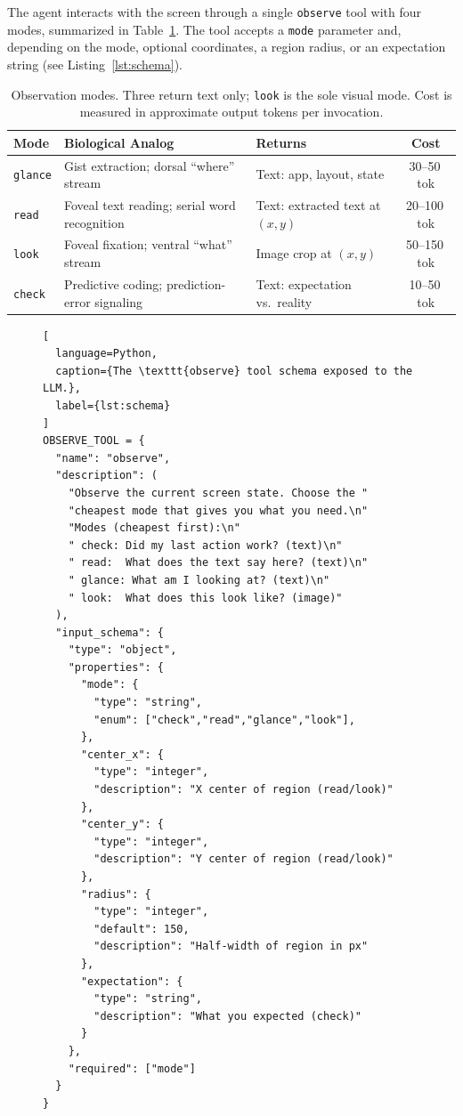 \documentclass[11pt,a4paper]{article}
\begin{document}
The agent interacts with the screen through a single \texttt{observe} tool
with four modes, summarized in Table~\ref{tab:modes}. The tool accepts a
\texttt{mode} parameter and, depending on the mode, optional coordinates, a
region radius, or an expectation string (see Listing~\ref{lst:schema}).

\begin{table}[t]
\centering
\caption{Observation modes. Three return text only; \texttt{look} is the sole
visual mode. Cost is measured in approximate output tokens per invocation.}
\label{tab:modes}
\small
\begin{tabular}{@{}lllc@{}}
\toprule
\textbf{Mode} & \textbf{Biological Analog} & \textbf{Returns} & \textbf{Cost} \\
\midrule
\texttt{glance} & Gist extraction; dorsal ``where'' stream &
  Text: app, layout, state & 30--50\,tok \\
\texttt{read} & Foveal text reading; serial word recognition &
  Text: extracted text at $(x,y)$ & 20--100\,tok \\
\texttt{look} & Foveal fixation; ventral ``what'' stream &
  Image crop at $(x,y)$ & 50--150\,tok \\
\texttt{check} & Predictive coding; prediction-error signaling &
  Text: expectation vs.\ reality & 10--50\,tok \\
\bottomrule
\end{tabular}
\end{table}

\begin{figure}[t]
\begin{lstlisting}[
  language=Python,
  caption={The \texttt{observe} tool schema exposed to the LLM.},
  label={lst:schema}
]
OBSERVE_TOOL = {
  "name": "observe",
  "description": (
    "Observe the current screen state. Choose the "
    "cheapest mode that gives you what you need.\n"
    "Modes (cheapest first):\n"
    " check: Did my last action work? (text)\n"
    " read:  What does the text say here? (text)\n"
    " glance: What am I looking at? (text)\n"
    " look:  What does this look like? (image)"
  ),
  "input_schema": {
    "type": "object",
    "properties": {
      "mode": {
        "type": "string",
        "enum": ["check","read","glance","look"],
      },
      "center_x": {
        "type": "integer",
        "description": "X center of region (read/look)"
      },
      "center_y": {
        "type": "integer",
        "description": "Y center of region (read/look)"
      },
      "radius": {
        "type": "integer",
        "default": 150,
        "description": "Half-width of region in px"
      },
      "expectation": {
        "type": "string",
        "description": "What you expected (check)"
      }
    },
    "required": ["mode"]
  }
}
\end{lstlisting}
\end{figure}
\end{document}
